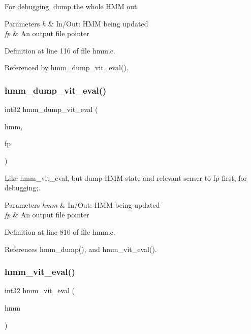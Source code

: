 For debugging, dump the whole H\+MM out. 


\begin{DoxyParams}{Parameters}
{\em h} & In/\+Out\+: H\+MM being updated \\
\hline
{\em fp} & An output file pointer \\
\hline
\end{DoxyParams}


Definition at line 116 of file hmm.\+c.



Referenced by hmm\+\_\+dump\+\_\+vit\+\_\+eval().

\mbox{\label{hmm_8h_a84947383bf7940f799918c37ece85cf0}} 
\subsubsection{hmm\+\_\+dump\+\_\+vit\+\_\+eval()}
{\footnotesize\ttfamily int32 hmm\+\_\+dump\+\_\+vit\+\_\+eval (\begin{DoxyParamCaption}\item[{\textbf{ hmm\+\_\+t} $\ast$}]{hmm,  }\item[{F\+I\+LE $\ast$}]{fp }\end{DoxyParamCaption})}



Like hmm\+\_\+vit\+\_\+eval, but dump H\+MM state and relevant senscr to fp first, for debugging;. 


\begin{DoxyParams}{Parameters}
{\em hmm} & In/\+Out\+: H\+MM being updated \\
\hline
{\em fp} & An output file pointer \\
\hline
\end{DoxyParams}


Definition at line 810 of file hmm.\+c.



References hmm\+\_\+dump(), and hmm\+\_\+vit\+\_\+eval().

\mbox{\label{hmm_8h_a24ed030b10cb07e12173b45d3800db4b}} 
\subsubsection{hmm\+\_\+vit\+\_\+eval()}
{\footnotesize\ttfamily int32 hmm\+\_\+vit\+\_\+eval (\begin{DoxyParamCaption}\item[{\textbf{ hmm\+\_\+t} $\ast$}]{hmm }\end{DoxyParamCaption})}



